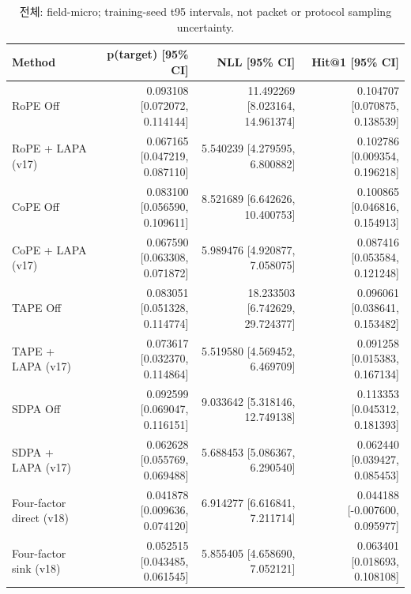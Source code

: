 \begin{table}[t]
\centering
\scriptsize
\caption{전체: field-micro; training-seed t95 intervals, not packet or protocol sampling uncertainty.}
\begin{tabular}{lrrr}
\toprule
Method & p(target) [95\% CI] & NLL [95\% CI] & Hit@1 [95\% CI] \\
\midrule
RoPE Off & 0.093108 [0.072072, 0.114144] & 11.492269 [8.023164, 14.961374] & 0.104707 [0.070875, 0.138539] \\
RoPE + LAPA (v17) & 0.067165 [0.047219, 0.087110] & 5.540239 [4.279595, 6.800882] & 0.102786 [0.009354, 0.196218] \\
CoPE Off & 0.083100 [0.056590, 0.109611] & 8.521689 [6.642626, 10.400753] & 0.100865 [0.046816, 0.154913] \\
CoPE + LAPA (v17) & 0.067590 [0.063308, 0.071872] & 5.989476 [4.920877, 7.058075] & 0.087416 [0.053584, 0.121248] \\
TAPE Off & 0.083051 [0.051328, 0.114774] & 18.233503 [6.742629, 29.724377] & 0.096061 [0.038641, 0.153482] \\
TAPE + LAPA (v17) & 0.073617 [0.032370, 0.114864] & 5.519580 [4.569452, 6.469709] & 0.091258 [0.015383, 0.167134] \\
SDPA Off & 0.092599 [0.069047, 0.116151] & 9.033642 [5.318146, 12.749138] & 0.113353 [0.045312, 0.181393] \\
SDPA + LAPA (v17) & 0.062628 [0.055769, 0.069488] & 5.688453 [5.086367, 6.290540] & 0.062440 [0.039427, 0.085453] \\
Four-factor direct (v18) & 0.041878 [0.009636, 0.074120] & 6.914277 [6.616841, 7.211714] & 0.044188 [-0.007600, 0.095977] \\
Four-factor sink (v18) & 0.052515 [0.043485, 0.061545] & 5.855405 [4.658690, 7.052121] & 0.063401 [0.018693, 0.108108] \\
\bottomrule
\end{tabular}
\end{table}
